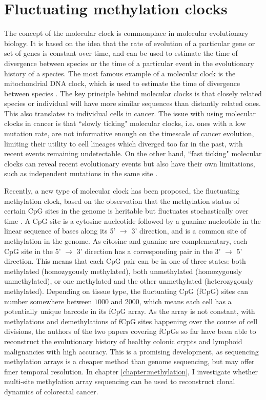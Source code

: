 \section{Fluctuating methylation clocks}
The concept of the molecular clock is commonplace in molecular evolutionary
biology. It is based on the idea that the rate of evolution of a particular
gene or set of genes is constant over time, and can be used to estimate the
time of divergence between species or the time of a particular event in the
evolutionary history of a species. The most famous example of a molecular clock
is the mitochondrial DNA clock, which is used to estimate the time of
divergence between species \cite{hasegawa_dating_1985}. The key principle
behind molecular clocks is that closely related species or individual will have
more similar sequences than distantly related ones. This also translates to
individual cells in cancer. The issue with using molecular clocks in cancer is
that ``slowly ticking" molecular clocks, i.e. ones with a low mutation rate,
are not informative enough on the timescale of cancer evolution, limiting their
utility to cell lineages which diverged too far in the past, with recent events
remaining undetectable. On the other hand, ``fast ticking" molecular clocks can
reveal recent evolutionary events but also have their own limitations, such as
independent mutations in the same site \cite{kuipers_single-cell_2017}. \par
Recently, a new type of molecular clock has been proposed, the fluctuating
methylation clock, based on the observation that the methylation status of
certain CpG sites in the genome is heritable but fluctuates stochastically over
time \cite{gabbutt_fluctuating_2022, gabbutt_evolutionary_2023}. A CpG site is
a cytosine nucleotide followed by a guanine nucleotide in the linear sequence
of bases along its 5' $\rightarrow$ 3' direction, and is a common site of
methylation in the genome. As citosine and guanine are complementary, each CpG
site in the 5' $\rightarrow$ 3' direction has a corresponding pair in the 3'
$\rightarrow$ 5' direction. This means that each CpG pair can be in one of
three states: both methylated (homozygously methylated), both unmethylated
(homozygously unmethylated), or one methylated and the other unmethylated
(heterozygously methylated). Depending on tissue type, the fluctuating CpG
(fCpG) sites can number somewhere between $1000$ and $2000$, which means each
cell has a potentially unique barcode in its fCpG array. As the array is not
constant, with methylations and demethylations of fCpG sites happening over the
course of cell divisions, the authors of the two papers covering fCpGs so far
have been able to reconstruct the evolutionary history of healthy colonic
crypts and lymphoid malignancies with high accuracy. This is a promising
development, as sequencing methylation arrays is a cheaper method than genome
sequencing, but may offer finer temporal resolution. In chapter
\ref{chapter:methylation}, I investigate whether multi-site methylation array
sequencing can be used to reconstruct clonal dynamics of colorectal cancer.


